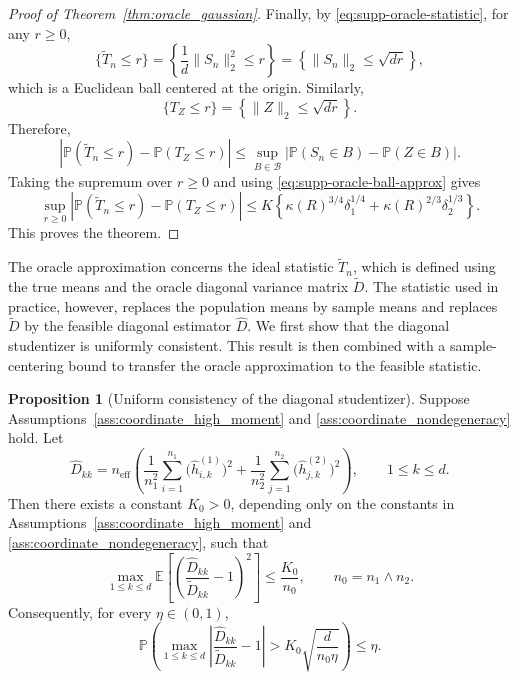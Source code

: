 \documentclass[
  12pt]{article}
\theoremstyle{plain}
\theoremstyle{definition}
\newtheorem{proposition}{Proposition}[section]
\theoremstyle{remark}
\begin{document}
\begin{proof}[Proof of Theorem~\ref{thm:oracle_gaussian}]
Finally, by \eqref{eq:supp-oracle-statistic}, for any \(r\ge0\),
\[
\{\widetilde T_n\le r\}
=
\left\{
\frac1d\|S_n\|_2^2\le r
\right\}
=
\left\{
\|S_n\|_2\le \sqrt{dr}
\right\},
\]
which is a Euclidean ball centered at the origin. Similarly,
\[
\{T_Z\le r\}
=
\left\{
\|Z\|_2\le \sqrt{dr}
\right\}.
\]
Therefore,
\[
\left|
\mathbb P(\widetilde T_n\le r)
-
\mathbb P(T_Z\le r)
\right|
\le
\sup_{B\in\mathcal B}
\left|
\mathbb P(S_n\in B)-\mathbb P(Z\in B)
\right|.
\]
Taking the supremum over \(r\ge0\) and using
\eqref{eq:supp-oracle-ball-approx} gives
\[
\sup_{r\ge0}
\left|
\mathbb P(\widetilde T_n\le r)
-
\mathbb P(T_Z\le r)
\right|
\le
K
\left\{
\kappa(R)^{3/4}\delta_1^{1/4}
+
\kappa(R)^{2/3}\delta_2^{1/3}
\right\}.
\]
This proves the theorem.
\end{proof}


The oracle approximation concerns the ideal statistic
\(\widetilde T_n\), which is defined using the true means and the oracle
diagonal variance matrix \(\widetilde D\). The statistic used in practice,
however, replaces the population means by sample means and replaces
\(\widetilde D\) by the feasible diagonal estimator \(\widehat D\). We first
show that the diagonal studentizer is uniformly consistent. This result is then
combined with a sample-centering bound to transfer the oracle approximation to
the feasible statistic.

\begin{proposition}[Uniform consistency of the diagonal studentizer]
\label{prop:studentizer_consistency}
Suppose Assumptions~\ref{ass:coordinate_high_moment} and
\ref{ass:coordinate_nondegeneracy} hold. Let
\[
  \widehat D_{kk}
  =
  n_{\mathrm{eff}}
  \left(
    \frac1{n_1^2}\sum_{i=1}^{n_1}
    \bigl(\widehat h_{i,k}^{(1)}\bigr)^2
    +
    \frac1{n_2^2}\sum_{j=1}^{n_2}
    \bigl(\widehat h_{j,k}^{(2)}\bigr)^2
  \right),
  \qquad 1\le k\le d.
\]
Then there exists a constant \(K_0>0\), depending only on the constants in
Assumptions~\ref{ass:coordinate_high_moment} and
\ref{ass:coordinate_nondegeneracy}, such that
\begin{equation}
\label{eq:supp-studentizer-mse}
\max_{1\le k\le d}
\mathbb E
\left[
\left(
\frac{\widehat D_{kk}}{\widetilde D_{kk}}-1
\right)^2
\right]
\le
\frac{K_0}{n_0},
\qquad
n_0=n_1\wedge n_2.
\end{equation}
Consequently, for every \(\eta\in(0,1)\),
\begin{equation}
\label{eq:supp-studentizer-hp}
\mathbb P
\left(
\max_{1\le k\le d}
\left|
\frac{\widehat D_{kk}}{\widetilde D_{kk}}-1
\right|
>
K_0\sqrt{\frac{d}{n_0\eta}}
\right)
\le \eta .
\end{equation}
\end{proposition}
\end{document}
